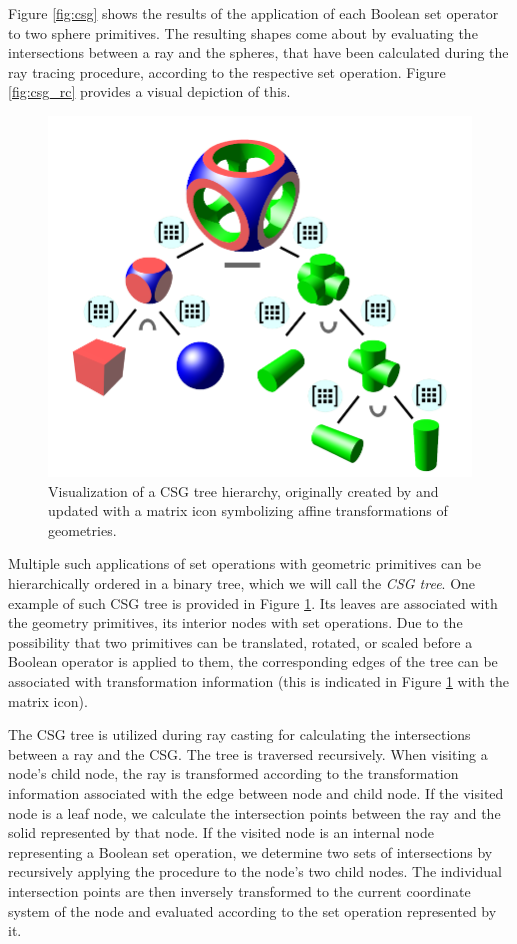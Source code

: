 Figure \ref{fig:csg} shows the results of the application of each Boolean set operator to two sphere primitives. The resulting shapes come about by evaluating the intersections between a ray and the spheres, that have been calculated during the ray tracing procedure, according to the respective set operation. Figure \ref{fig:csg_rc} provides a visual depiction of this.

\begin{figure}
	\centering
	\includegraphics[width=.9\linewidth]{img/1 fundamentals/csg_tree.png}
	\caption{Visualization of a CSG tree hierarchy, originally created by \cite{csgtree} and updated
		with a matrix icon symbolizing affine transformations of geometries.}
	\label{fig:csg_tree}
\end{figure}

Multiple such applications of set operations with geometric primitives can be hierarchically ordered in a binary tree, which we will call the \emph{CSG tree}. One example of such CSG tree is provided in Figure \ref{fig:csg_tree}. Its leaves are associated with the geometry primitives, its interior nodes with set operations. Due to the possibility that two primitives can be translated, rotated, or scaled before a Boolean operator is applied to them, the corresponding edges of the tree can be associated with transformation information (this is indicated in Figure \ref{fig:csg_tree} with the matrix icon).

The CSG tree is utilized during ray casting for calculating the intersections between a ray and the CSG. The tree is traversed recursively. When visiting a node's child node, the ray is transformed according to the transformation information associated with the edge between node and child node. If the visited node is a leaf node, we calculate the intersection points between the ray and the solid represented by that node. If the visited node is an internal node representing a Boolean set operation, we determine two sets of intersections by recursively applying the procedure to the node's two child nodes. The individual intersection points are then inversely transformed to the current coordinate system of the node and evaluated according to the set operation represented by it.

